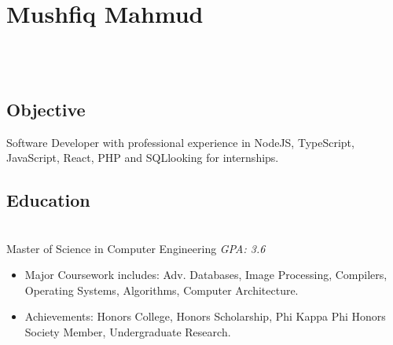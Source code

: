 \documentclass[]{resume}
\begin{document}
\sffamily

\section{Mushfiq Mahmud}

\begin{center}
\address{Tampa, FL}
 \\

 \\
\end{center}


\subsection{Objective}
Software Developer with professional experience in NodeJS, TypeScript, JavaScript, React, PHP and SQLlooking for internships.


\subsection{Education}
 \\
Master of Science in Computer Engineering \hfill \emph{GPA: 3.6}

\begin{itemize}
\item Major Coursework includes: Adv. Databases, Image Processing, Compilers, Operating Systems, Algorithms, Computer Architecture.
\item Achievements: Honors College, Honors Scholarship, Phi Kappa Phi Honors Society Member, Undergraduate Research.
\end{itemize}

\end{document}
